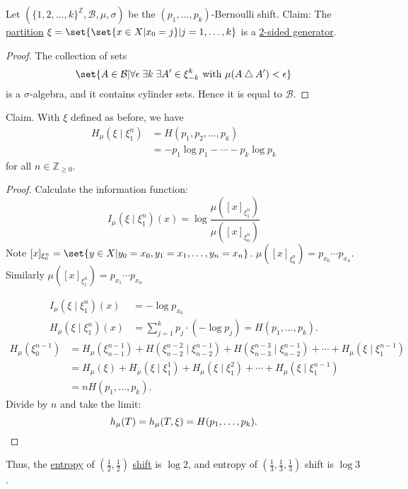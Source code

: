 \documentclass{article}
\newcommand{\sym}{\bigtriangleup}
\begin{document}
\color{gray}
Let $(\{1,2,\dotsc,k\}^\mathbb{Z}, \mathcal{B},\mu,\sigma)$ be the $(p_1, \dotsc, p_k)$-Bernoulli shift.
Claim:
The \hyperlink{def:partition}{partition} $\xi = \set{\set{x \in X | x_0 = j} | j = 1, \dotsc, k}$ is a \hyperlink{def:gen}{2-sided generator}.
\begin{proof}
  The collection of sets
  \begin{equation*}
    \set{A \in \mathcal{B} | \forall \epsilon \; \exists k \; \exists A' \in \xi_{-k}^k \text{ with } \mu(A \sym A') < \epsilon}
  \end{equation*}
  is a $\sigma$-algebra, and it contains cylinder sets. Hence it is equal to $\mathcal{B}$.
\end{proof}
Claim. With $\xi$ defined as before, we have
\begin{align*}
  H_\mu(\xi \mid \xi_1^n) &= H(p_1, p_2, \dotsc, p_k) \\
                          &= -p_1 \log p_1 - \dotsb - p_k \log p_k
\end{align*}
for all $n \in \mathbb{Z}_{\geq 0}$.
\begin{proof}
  Calculate the information function:
  \begin{equation*}
    I_\mu(\xi \mid \xi_1^n)(x) = \log \frac{\mu([x]_{\xi_1^n})}{\mu([x]_{\xi_0^n})}
  \end{equation*}
  Note
  $[x]_{\xi_0^n} = \set{y \in X | y_0 = x_0 , y_1 = x_1, \dotsc, y_n = x_n}$.
  $\mu([x]_{\xi_0^n}) = p_{x_0} \dotsm p_{x_n}$. Similarly $\mu([x]_{\xi_1^n}) = p_{x_1} \dotsm p_{x_n}$

  \begin{align*}
    I_\mu(\xi \mid \xi_1^n)(x) &= -\log p_{x_0} \\
    H_\mu(\xi \mid \xi_1^n)(x) &= \sum_{j=1}^k p_j \cdot (-\log p_j) = H(p_1, \dotsc, p_k).
  \end{align*}
  \begin{align*}
    H_\mu(\xi_0^{n-1}) &= H_\mu(\xi_{n-1}^{n-1}) + H(\xi_{n-2}^{n-2} \mid \xi_{n-2}^{n-1}) + H(\xi_{n-3}^{n-3} \mid \xi_{n-2}^{n-1}) + \dotsb + H_\mu(\xi \mid \xi_1^{n-1}) \\
                       &= H_\mu(\xi) + H_\mu(\xi \mid \xi_1^1) + H_\mu(\xi \mid \xi_1^2) + \dotsb + H_\mu(\xi \mid \xi_1^{n-1}) \\
                       &= n H(p_1, \dotsc, p_k).
  \end{align*}
  Divide by $n$ and take the limit:
  \begin{equation*}
    h_\mu(T) = h_\mu(T, \xi) = H(p_1, \dotsc, p_k). \qedhere
  \end{equation*}
\end{proof}
\color{black}
Thus, the \hyperlink{def:h}{entropy} of $(\frac{1}{2},\frac{1}{2})$ \hyperlink{def:bernoullishift}{shift} is $\log 2$, and entropy of $(\frac{1}{3},\frac{1}{3},\frac{1}{3})$ shift is $\log 3$.
\printindex
\end{document}
